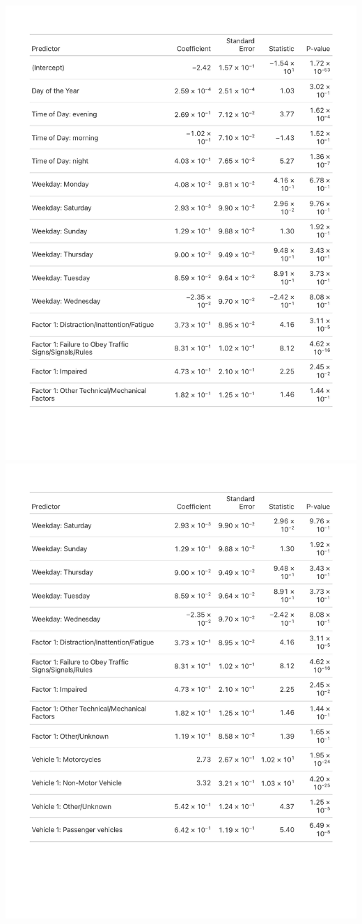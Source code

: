 \documentclass[
  letterpaper,
  DIV=11,
  numbers=noendperiod]{scrartcl}
\begin{document}
\includegraphics{table1.pdf} \includegraphics{table2.pdf}
\end{document}
